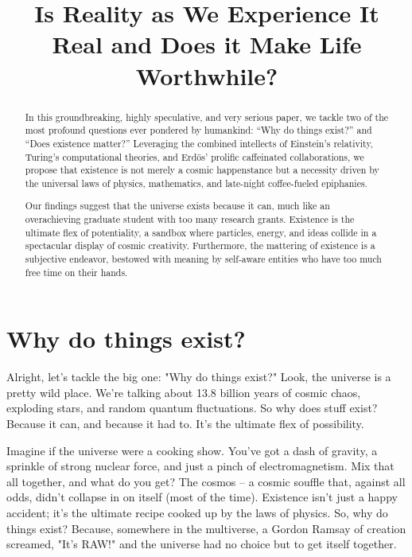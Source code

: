 \documentclass{Axon}
\title{Is Reality as We Experience It Real and Does it Make Life Worthwhile?}
\begin{document}
\maketitle
\makeauthor
\begin{abstract}
In this groundbreaking, highly speculative, and very serious paper, we tackle two of the most profound questions ever pondered by humankind: “Why do things exist?” and “Does existence matter?” Leveraging the combined intellects of Einstein’s relativity, Turing’s computational theories, and Erdös’ prolific caffeinated collaborations, we propose that existence is not merely a cosmic happenstance but a necessity driven by the universal laws of physics, mathematics, and late-night coffee-fueled epiphanies.

Our findings suggest that the universe exists because it can, much like an overachieving graduate student with too many research grants. Existence is the ultimate flex of potentiality, a sandbox where particles, energy, and ideas collide in a spectacular display of cosmic creativity. Furthermore, the mattering of existence is a subjective endeavor, bestowed with meaning by self-aware entities who have too much free time on their hands.
\end{abstract}
\section{Why do things exist?}
Alright, let's tackle the big one: "Why do things exist?" Look, the universe is a pretty wild place. We're talking about 13.8 billion years of cosmic chaos, exploding stars, and random quantum fluctuations. So why does stuff exist? Because it can, and because it had to. It's the ultimate flex of possibility.

\begin{example}
    Imagine if the universe were a cooking show. You’ve got a dash of gravity, a sprinkle of strong nuclear force, and just a pinch of electromagnetism. Mix that all together, and what do you get? The cosmos – a cosmic souffle that, against all odds, didn’t collapse in on itself (most of the time). Existence isn’t just a happy accident; it’s the ultimate recipe cooked up by the laws of physics. So, why do things exist? Because, somewhere in the multiverse, a Gordon Ramsay of creation screamed, "It’s RAW!" and the universe had no choice but to get itself together.
\end{example}
\end{document}
